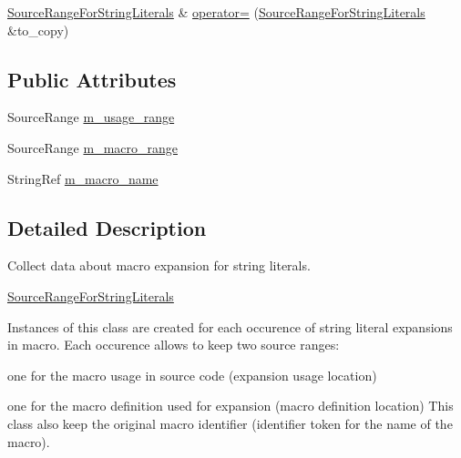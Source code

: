 \begin{DoxyCompactItemize}
\item 
\hyperlink{classclang_1_1tidy_1_1pagesjaunes_1_1_exec_s_q_l_open_to_function_call_1_1_source_range_for_string_literals}{Source\+Range\+For\+String\+Literals} \& \hyperlink{classclang_1_1tidy_1_1pagesjaunes_1_1_exec_s_q_l_open_to_function_call_1_1_source_range_for_string_literals_aef03cd052a29cdf1f0a77b3a4f53141f}{operator=} (\hyperlink{classclang_1_1tidy_1_1pagesjaunes_1_1_exec_s_q_l_open_to_function_call_1_1_source_range_for_string_literals}{Source\+Range\+For\+String\+Literals} \&to\+\_\+copy)
\end{DoxyCompactItemize}
\subsection*{Public Attributes}
\begin{DoxyCompactItemize}
\item 
Source\+Range \hyperlink{classclang_1_1tidy_1_1pagesjaunes_1_1_exec_s_q_l_open_to_function_call_1_1_source_range_for_string_literals_acd586275a2f09ae255094babd1842a13}{m\+\_\+usage\+\_\+range}
\item 
Source\+Range \hyperlink{classclang_1_1tidy_1_1pagesjaunes_1_1_exec_s_q_l_open_to_function_call_1_1_source_range_for_string_literals_acf2dbb3e587c4150930ff5d830824250}{m\+\_\+macro\+\_\+range}
\item 
String\+Ref \hyperlink{classclang_1_1tidy_1_1pagesjaunes_1_1_exec_s_q_l_open_to_function_call_1_1_source_range_for_string_literals_a37bd1a32e4df4306ae99daf3bb3743d4}{m\+\_\+macro\+\_\+name}
\end{DoxyCompactItemize}


\subsection{Detailed Description}
Collect data about macro expansion for string literals. 

\hyperlink{classclang_1_1tidy_1_1pagesjaunes_1_1_exec_s_q_l_open_to_function_call_1_1_source_range_for_string_literals}{Source\+Range\+For\+String\+Literals}

Instances of this class are created for each occurence of string literal expansions in macro. Each occurence allows to keep two source ranges\+:
\begin{DoxyItemize}
\item one for the macro usage in source code (expansion usage location)
\item one for the macro definition used for expansion (macro definition location) This class also keep the original macro identifier (identifier token for the name of the macro). 
\end{DoxyItemize}

